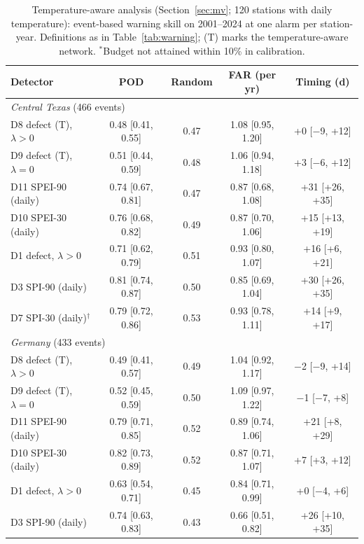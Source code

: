 \begin{table}[tbp]
\caption{Temperature-aware analysis (Section~\ref{sec:mv}; 120 stations with daily temperature):
event-based warning skill on 2001--2024 at one alarm per station-year. Definitions as in
Table~\ref{tab:warning}; (T) marks the temperature-aware network. $^{\ast}$Budget not attained within
10\% in calibration.}
\label{tab:warningmv}
\footnotesize\setlength{\tabcolsep}{2pt}
\begin{tabular*}{\textwidth}{@{\extracolsep\fill}lcccc}
\toprule
Detector & POD & Random & FAR (per yr) & Timing (d)\\
\midrule
\multicolumn{5}{l}{\textit{Central Texas} (466 events)}\\
\quad D8 defect (T), $\lambda>0$ & 0.48 [0.41, 0.55] & 0.47 & 1.08 [0.95, 1.20] & +0 [$-$9, +12] \\
\quad D9 defect (T), $\lambda=0$ & 0.51 [0.44, 0.59] & 0.48 & 1.06 [0.94, 1.18] & +3 [$-$6, +12] \\
\quad D11 SPEI-90 (daily) & 0.74 [0.67, 0.81] & 0.47 & 0.87 [0.68, 1.08] & +31 [+26, +35] \\
\quad D10 SPEI-30 (daily) & 0.76 [0.68, 0.82] & 0.49 & 0.87 [0.70, 1.06] & +15 [+13, +19] \\
\quad D1 defect, $\lambda>0$ & 0.71 [0.62, 0.79] & 0.51 & 0.93 [0.80, 1.07] & +16 [+6, +21] \\
\quad D3 SPI-90 (daily) & 0.81 [0.74, 0.87] & 0.50 & 0.85 [0.69, 1.04] & +30 [+26, +35] \\
\quad D7 SPI-30 (daily)$^{\dagger}$ & 0.79 [0.72, 0.86] & 0.53 & 0.93 [0.78, 1.11] & +14 [+9, +17] \\
\midrule
\multicolumn{5}{l}{\textit{Germany} (433 events)}\\
\quad D8 defect (T), $\lambda>0$ & 0.49 [0.41, 0.57] & 0.49 & 1.04 [0.92, 1.17] & $-$2 [$-$9, +14] \\
\quad D9 defect (T), $\lambda=0$ & 0.52 [0.45, 0.59] & 0.50 & 1.09 [0.97, 1.22] & $-$1 [$-$7, +8] \\
\quad D11 SPEI-90 (daily) & 0.79 [0.71, 0.85] & 0.52 & 0.89 [0.74, 1.06] & +21 [+8, +29] \\
\quad D10 SPEI-30 (daily) & 0.82 [0.73, 0.89] & 0.52 & 0.87 [0.71, 1.07] & +7 [+3, +12] \\
\quad D1 defect, $\lambda>0$ & 0.63 [0.54, 0.71] & 0.45 & 0.84 [0.71, 0.99] & +0 [$-$4, +6] \\
\quad D3 SPI-90 (daily) & 0.74 [0.63, 0.83] & 0.43 & 0.66 [0.51, 0.82] & +26 [+10, +35] \\

\end{tabular*}
\end{table}
